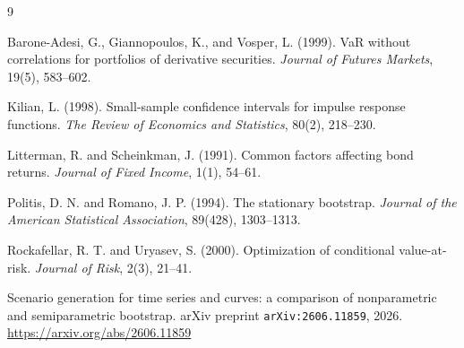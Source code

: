 \documentclass[11pt,a4paper]{article}
\begin{document}
\begin{thebibliography}{9}

Barone-Adesi, G., Giannopoulos, K., and Vosper, L. (1999).
\newblock VaR without correlations for portfolios of derivative securities.
\newblock \emph{Journal of Futures Markets}, 19(5), 583--602.

Kilian, L. (1998).
\newblock Small-sample confidence intervals for impulse response functions.
\newblock \emph{The Review of Economics and Statistics}, 80(2), 218--230.

Litterman, R. and Scheinkman, J. (1991).
\newblock Common factors affecting bond returns.
\newblock \emph{Journal of Fixed Income}, 1(1), 54--61.

Politis, D. N. and Romano, J. P. (1994).
\newblock The stationary bootstrap.
\newblock \emph{Journal of the American Statistical Association}, 89(428),
  1303--1313.

Rockafellar, R. T. and Uryasev, S. (2000).
\newblock Optimization of conditional value-at-risk.
\newblock \emph{Journal of Risk}, 2(3), 21--41.

Scenario generation for time series and curves: a comparison of nonparametric
  and semiparametric bootstrap.
\newblock arXiv preprint \texttt{arXiv:2606.11859}, 2026.
\newblock \url{https://arxiv.org/abs/2606.11859}

\end{thebibliography}
\end{document}
